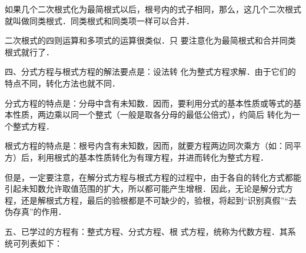 如果几个二次根式化为最简根式以后，根号内的式子相同，那么，这几个二次根式就叫做同类根式．同类根式和同类项一样可以合并．

二次根式的四则运算和多项式的运算很类似．只
要注意化为最简根式和合并同类根式就行了．

四、分式方程与根式方程的解法要点是：设法转
化为整式方程求解．由于它们的特点不同，转化方法也就不同．

分式方程的特点是：分母中含有未知数．因而，要利用分式的基本性质或等式的基本性质，两边乘以同一个整式（一般是取各分母的最低公倍式），约简后
转化为一个整式方程．

根式方程的特点是：根号内含有未知数，因而，就要方程两边同次乘方（如：同平方）后，利用根式的基本性质转化为有理方程，并进而转化为整式方程．

但是，一定要注意，在解分式方程与根式方程的过程中，由于各自的转化方式都能引起未知数允许取值范围的扩大，所以都可能产生增根．因此，无论是解分式方程，还是解根式方程，最后的验根都是不可缺少的，验根，将起到“识别真假”“去伪存真”的作用．

五、已学过的方程有：整式方程、分式方程、根
式方程，统称为代数方程．其系统可列表如下：
\begin{center}
\end{center}

